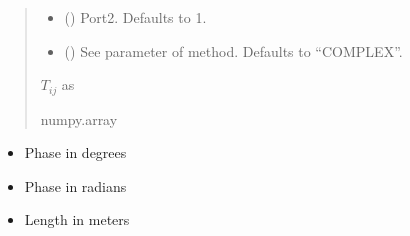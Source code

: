 \documentclass[letterpaper,10pt,english]{sphinxmanual}
\begin{document}
\begin{fulllineitems}
\begin{fulllineitems}
\begin{quote}
\begin{description}
\begin{itemize}
\item {}
\sphinxAtStartPar
{} (\sphinxstyleliteralemphasis{\sphinxupquote{, }}) \textendash{} Port\sphinxhyphen{}2. Defaults to 1.

\item {}
\sphinxAtStartPar
{} (\sphinxstyleliteralemphasis{\sphinxupquote{, }}) \textendash{} See  parameter of  method. Defaults to “COMPLEX”.

\end{itemize}

\sphinxAtStartPar
\(T_{i j}\) as 

\sphinxAtStartPar
numpy.array

\end{description}\end{quote}

\end{fulllineitems}


\begin{fulllineitems}
\label{\detokenize{touchstone:touchstone.spfile.UniformDeembed}}
\pysigstartsignatures
{}
\pysigstopsignatures\begin{description}
\begin{itemize}
\item {}
\sphinxAtStartPar
Phase in degrees

\item {}
\sphinxAtStartPar
Phase in radians

\item {}
\sphinxAtStartPar
Length in meters


\end{itemize}
\end{description}
\end{fulllineitems}
\end{fulllineitems}
\end{document}
